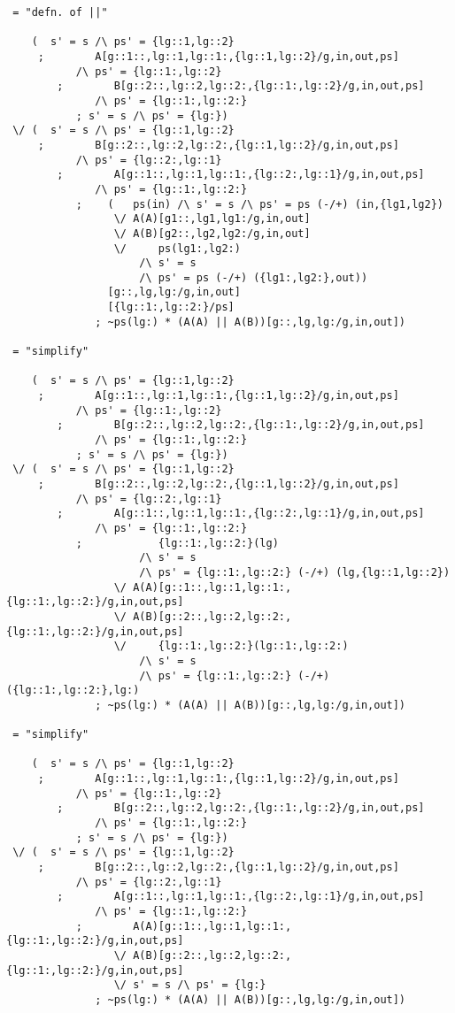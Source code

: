 \begin{verbatim}
 = "defn. of ||"

    (  s' = s /\ ps' = {lg::1,lg::2}
     ;        A[g::1::,lg::1,lg::1:,{lg::1,lg::2}/g,in,out,ps]
           /\ ps' = {lg::1:,lg::2}
        ;        B[g::2::,lg::2,lg::2:,{lg::1:,lg::2}/g,in,out,ps]
              /\ ps' = {lg::1:,lg::2:}
           ; s' = s /\ ps' = {lg:})
 \/ (  s' = s /\ ps' = {lg::1,lg::2}
     ;        B[g::2::,lg::2,lg::2:,{lg::1,lg::2}/g,in,out,ps]
           /\ ps' = {lg::2:,lg::1}
        ;        A[g::1::,lg::1,lg::1:,{lg::2:,lg::1}/g,in,out,ps]
              /\ ps' = {lg::1:,lg::2:}
           ;    (   ps(in) /\ s' = s /\ ps' = ps (-/+) (in,{lg1,lg2})
                 \/ A(A)[g1::,lg1,lg1:/g,in,out]
                 \/ A(B)[g2::,lg2,lg2:/g,in,out]
                 \/     ps(lg1:,lg2:)
                     /\ s' = s
                     /\ ps' = ps (-/+) ({lg1:,lg2:},out))
                [g::,lg,lg:/g,in,out]
                [{lg::1:,lg::2:}/ps]
              ; ~ps(lg:) * (A(A) || A(B))[g::,lg,lg:/g,in,out])

 = "simplify"

    (  s' = s /\ ps' = {lg::1,lg::2}
     ;        A[g::1::,lg::1,lg::1:,{lg::1,lg::2}/g,in,out,ps]
           /\ ps' = {lg::1:,lg::2}
        ;        B[g::2::,lg::2,lg::2:,{lg::1:,lg::2}/g,in,out,ps]
              /\ ps' = {lg::1:,lg::2:}
           ; s' = s /\ ps' = {lg:})
 \/ (  s' = s /\ ps' = {lg::1,lg::2}
     ;        B[g::2::,lg::2,lg::2:,{lg::1,lg::2}/g,in,out,ps]
           /\ ps' = {lg::2:,lg::1}
        ;        A[g::1::,lg::1,lg::1:,{lg::2:,lg::1}/g,in,out,ps]
              /\ ps' = {lg::1:,lg::2:}
           ;            {lg::1:,lg::2:}(lg)
                     /\ s' = s
                     /\ ps' = {lg::1:,lg::2:} (-/+) (lg,{lg::1,lg::2})
                 \/ A(A)[g::1::,lg::1,lg::1:,{lg::1:,lg::2:}/g,in,out,ps]
                 \/ A(B)[g::2::,lg::2,lg::2:,{lg::1:,lg::2:}/g,in,out,ps]
                 \/     {lg::1:,lg::2:}(lg::1:,lg::2:)
                     /\ s' = s
                     /\ ps' = {lg::1:,lg::2:} (-/+) ({lg::1:,lg::2:},lg:)
              ; ~ps(lg:) * (A(A) || A(B))[g::,lg,lg:/g,in,out])

 = "simplify"

    (  s' = s /\ ps' = {lg::1,lg::2}
     ;        A[g::1::,lg::1,lg::1:,{lg::1,lg::2}/g,in,out,ps]
           /\ ps' = {lg::1:,lg::2}
        ;        B[g::2::,lg::2,lg::2:,{lg::1:,lg::2}/g,in,out,ps]
              /\ ps' = {lg::1:,lg::2:}
           ; s' = s /\ ps' = {lg:})
 \/ (  s' = s /\ ps' = {lg::1,lg::2}
     ;        B[g::2::,lg::2,lg::2:,{lg::1,lg::2}/g,in,out,ps]
           /\ ps' = {lg::2:,lg::1}
        ;        A[g::1::,lg::1,lg::1:,{lg::2:,lg::1}/g,in,out,ps]
              /\ ps' = {lg::1:,lg::2:}
           ;        A(A)[g::1::,lg::1,lg::1:,{lg::1:,lg::2:}/g,in,out,ps]
                 \/ A(B)[g::2::,lg::2,lg::2:,{lg::1:,lg::2:}/g,in,out,ps]
                 \/ s' = s /\ ps' = {lg:}
              ; ~ps(lg:) * (A(A) || A(B))[g::,lg,lg:/g,in,out])


\end{verbatim}
